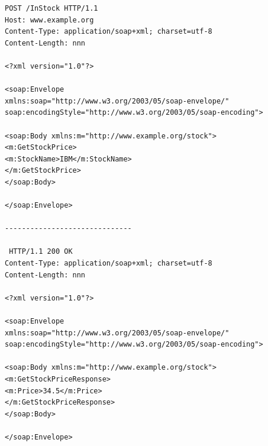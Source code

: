 \documentclass[fleqn,10pt,ngerman]{SelfArx}
\begin{document}
\begin{lstlisting}[caption=Beispiel: SOAP-Request und SOAP-Response als Envelope, label=envelopesoap]
 POST /InStock HTTP/1.1
Host: www.example.org
Content-Type: application/soap+xml; charset=utf-8
Content-Length: nnn

<?xml version="1.0"?>

<soap:Envelope
xmlns:soap="http://www.w3.org/2003/05/soap-envelope/"
soap:encodingStyle="http://www.w3.org/2003/05/soap-encoding">

<soap:Body xmlns:m="http://www.example.org/stock">
<m:GetStockPrice>
<m:StockName>IBM</m:StockName>
</m:GetStockPrice>
</soap:Body>

</soap:Envelope>

------------------------------

 HTTP/1.1 200 OK
Content-Type: application/soap+xml; charset=utf-8
Content-Length: nnn

<?xml version="1.0"?>

<soap:Envelope
xmlns:soap="http://www.w3.org/2003/05/soap-envelope/"
soap:encodingStyle="http://www.w3.org/2003/05/soap-encoding">

<soap:Body xmlns:m="http://www.example.org/stock">
<m:GetStockPriceResponse>
<m:Price>34.5</m:Price>
</m:GetStockPriceResponse>
</soap:Body>

</soap:Envelope>
\end{lstlisting}
\end{document}
